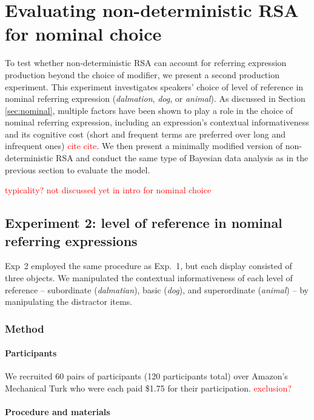 \documentclass[11pt]{article}
\newcommand{\red}[1]{\textcolor{Red}{#1}}
\newcommand{\sectionref}[1]{Section \ref{#1}}
\begin{document}
\section{Evaluating non-deterministic RSA for nominal choice}

To test whether non-deterministic RSA can account for referring expression production beyond the choice of modifier, we present a  second production experiment. This experiment investigates speakers' choice of level of reference in nominal referring expression (\emph{dalmation}, \emph{dog}, or \emph{animal}). As discussed in \sectionref{sec:nominal},  multiple factors have been shown to play a role in the choice of nominal referring expression, including an expression's contextual informativeness and its cognitive cost (short and frequent terms are preferred over long and infrequent ones) \red{cite cite}.   We then present a minimally modified version of non-deterministic RSA and conduct the same type of Bayesian data analysis as in the previous section to evaluate the model.

\red{typicality? not discussed yet in intro for nominal choice}

\subsection{Experiment 2: level of reference in nominal referring expressions}
\label{sec:exp2}

Exp~2 employed the same procedure as Exp.~1, but each display consisted of three objects. We manipulated the contextual informativeness of each level of reference -- subordinate (\emph{dalmatian}), basic (\emph{dog}), and superordinate (\emph{animal}) -- by manipulating the distractor items. 

\subsubsection{Method}

\paragraph{Participants}

We recruited 60 pairs of participants (120 participants total) over Amazon's Mechanical Turk who were each paid \$1.75 for their participation. \red{exclusion?}

\paragraph{Procedure and materials}
\end{document}
